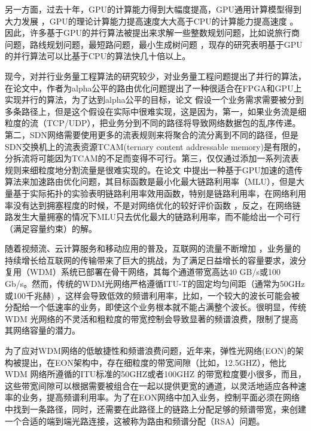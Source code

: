 \documentclass[master]{thesis-uestc}
\begin{document}
另一方面，过去十年，GPU的计算能力得到大幅度提高，GPU通用计算模型得到大力发展 ，GPU的理论计算能力提高速度大大高于CPU的计算能力提高速度 。因此，许多基于GPU的并行算法被提出来求解一些整数规划问题，比如说旅行商问题，路线规划问题，最短路问题，最小生成树问题 ，现存的研究表明基于GPU的并行算法可以比基于CPU的算法快几十倍以上。

现今，对并行业务量工程算法的研究较少，对业务量工程问题提出了并行的算法，在论文中，作者为alpha公平的路由优化问题提出了一种很适合在FPGA和GPU上实现并行的算法，为了达到alpha公平的目标，论文 假设一个业务需求需要被分到多条路径上，但是这个假设在实际中很难实现，这是因为，第一，如果业务流是细粒度的流（TCP/UDP），把业务分到不同的路径将导致网络数据包的乱序传递。第二，SDN网络需要使用更多的流表规则来将聚合的流分离到不同的路径，但是SDN交换机上的流表资源TCAM(ternary content addressable memory)是有限的，分拆流将可能因为TCAM的不足而变得不可行。第三，仅仅通过添加一系列流表规则来细粒度地分割流量是很难实现的。在论文 中提出一种基于GPU加速的遗传算法来加速路由优化问题，其目标函数是最小化最大链路利用率（MLU），但是大量基于实际拓扑的实验表明链路利用率效用函数，特别是链路利用率，在网络利用率没有达到拥塞程度的时候，不是对网络优化的较好评价函数 ，反之，在网络链路发生大量拥塞的情况下MLU只去优化最大的链路利用率，而不能给出一个可行（满足容量约束）的解。

随着视频流、云计算服务和移动应用的普及，互联网的流量不断增加 ，业务量的持续增长给互联网的传输带来了巨大的挑战，为了满足日益增长的容量要求，波分复用（WDM）系统已部署在骨干网络，其每个通道带宽高达40 GB/s或100 Gb/s。然而，传统的WDM光网络严格遵循ITU-T的固定均匀间距（通常为50GHz或100千兆赫) ，这样会导致低效的频谱利用率，比如，一个较大的波长可能会被分配给一个低速率的业务，即使这个业务根本就不能占满整个波长。很明显，传统WDM 光网络的不灵活和粗粒度的带宽控制会导致显著的频谱浪费，限制了提高其网络容量的潜力。

为了应对WDM网络的低敏捷性和频谱浪费问题，近年来，弹性光网络(EON)的架构被提出，在EON架构中，存在细粒度的带宽间隙（比如，12.5GHZ），他比WDM 网络所遵循的ITU标准的50GHZ或者100GHZ 的带宽粒度要小很多，而且，这些带宽间隙可以根据需要被组合在一起以提供更宽的通道，以灵活地适应各种速率的业务，提高频谱利用率。为了在EON网络中加入业务，控制平面必须在网络中找到一条路径，同时，还需要在此路径上的链路上分配足够的频谱带宽，来创建一个合适的端到端光路连接，这被称为路由和频谱分配（RSA）问题。
\end{document}
